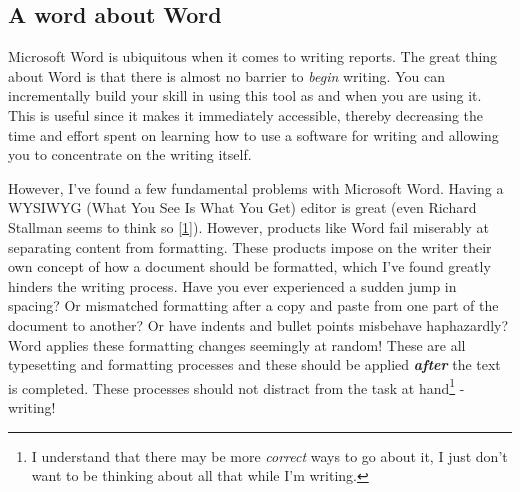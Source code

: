 \documentclass[journal,]{IEEEtran}
\begin{document}
\hypertarget{a-word-about-word}{%
\subsection{A word about Word}\label{a-word-about-word}}

Microsoft Word is ubiquitous when it comes to writing reports. The great
thing about Word is that there is almost no barrier to \emph{begin}
writing. You can incrementally build your skill in using this tool as
and when you are using it. This is useful since it makes it immediately
accessible, thereby decreasing the time and effort spent on learning how
to use a software for writing and allowing you to concentrate on the
writing itself.

However, I've found a few fundamental problems with Microsoft Word.
Having a WYSIWYG (What You See Is What You Get) editor is great (even
Richard Stallman seems to think so
{[}\protect\hyperlink{ref-stallman_emacs_nodate}{1}{]}). However,
products like Word fail miserably at separating content from formatting.
These products impose on the writer their own concept of how a document
should be formatted, which I've found greatly hinders the writing
process. Have you ever experienced a sudden jump in spacing? Or
mismatched formatting after a copy and paste from one part of the
document to another? Or have indents and bullet points misbehave
haphazardly? Word applies these formatting changes seemingly at random!
These are all typesetting and formatting processes and these should be
applied \textbf{\emph{after}} the text is completed. These processes
should not distract from the task at hand\footnote{I understand that
  there may be more \emph{correct} ways to go about it, I just don't
  want to be thinking about all that while I'm writing.} - writing!
\end{document}
